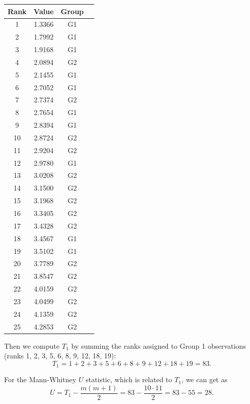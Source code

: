 \documentclass[letterpaper]{article}
\begin{document}
		\begin{center}
			\begin{tabular}{cccc}
				\hline
				Rank & Value & Group & \\
				\hline
				1  & 1.3366 & G1 \\
				2  & 1.7992 & G1 \\
				3  & 1.9168 & G1 \\
				4  & 2.0894 & G2 \\
				5  & 2.1455 & G1 \\
				6  & 2.7052 & G1 \\
				7  & 2.7374 & G2 \\
				8  & 2.7654 & G1 \\
				9  & 2.8394 & G1 \\
				10 & 2.8724 & G2 \\
				11 & 2.9204 & G2 \\
				12 & 2.9780 & G1 \\
				13 & 3.0208 & G2 \\
				14 & 3.1500 & G2 \\
				15 & 3.1968 & G2 \\
				16 & 3.3405 & G2 \\
				17 & 3.4328 & G2 \\
				18 & 3.4567 & G1 \\
				19 & 3.5102 & G1 \\
				20 & 3.7789 & G2 \\
				21 & 3.8547 & G2 \\
				22 & 4.0159 & G2 \\
				23 & 4.0499 & G2 \\
				24 & 4.1359 & G2 \\
				25 & 4.2853 & G2 \\
				\hline
			\end{tabular}
		\end{center}
		
		Then we compute $T_1$ by summing the ranks assigned to Group 1 observations (ranks 1, 2, 3, 5, 6, 8, 9, 12, 18, 19):
		$$T_1 = 1+2+3+5+6+8+9+12+18+19 = 83.$$
		
		For the Mann-Whitney $U$ statistic, which is related to $T_1$, we can get as
		$$U = T_1 - \frac{m(m+1)}{2} = 83 - \frac{10\cdot 11}{2} = 83 - 55 = 28.$$
		
\end{document}
